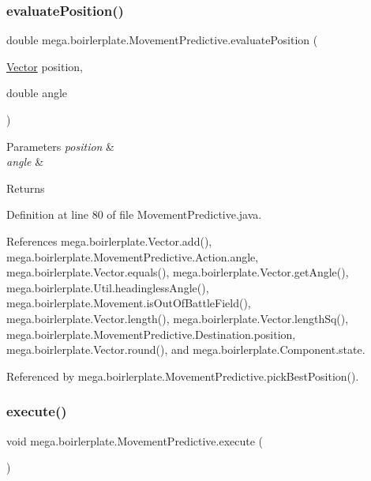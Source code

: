 \subsubsection{\texorpdfstring{evaluate\+Position()}{evaluatePosition()}}
{\footnotesize\ttfamily double mega.\+boirlerplate.\+Movement\+Predictive.\+evaluate\+Position (\begin{DoxyParamCaption}\item[{\hyperlink{classmega_1_1boirlerplate_1_1_vector}{Vector}}]{position,  }\item[{double}]{angle }\end{DoxyParamCaption})\hspace{0.3cm}{\ttfamily [private]}}


\begin{DoxyParams}{Parameters}
{\em position} & \\
\hline
{\em angle} & \\
\hline
\end{DoxyParams}
\begin{DoxyReturn}{Returns}

\end{DoxyReturn}


Definition at line 80 of file Movement\+Predictive.\+java.



References mega.\+boirlerplate.\+Vector.\+add(), mega.\+boirlerplate.\+Movement\+Predictive.\+Action.\+angle, mega.\+boirlerplate.\+Vector.\+equals(), mega.\+boirlerplate.\+Vector.\+get\+Angle(), mega.\+boirlerplate.\+Util.\+headingless\+Angle(), mega.\+boirlerplate.\+Movement.\+is\+Out\+Of\+Battle\+Field(), mega.\+boirlerplate.\+Vector.\+length(), mega.\+boirlerplate.\+Vector.\+length\+Sq(), mega.\+boirlerplate.\+Movement\+Predictive.\+Destination.\+position, mega.\+boirlerplate.\+Vector.\+round(), and mega.\+boirlerplate.\+Component.\+state.



Referenced by mega.\+boirlerplate.\+Movement\+Predictive.\+pick\+Best\+Position().

\mbox{\label{classmega_1_1boirlerplate_1_1_movement_predictive_a853ee3e04ab6da678f29c371f5b76e1a}} 
\subsubsection{\texorpdfstring{execute()}{execute()}}
{\footnotesize\ttfamily void mega.\+boirlerplate.\+Movement\+Predictive.\+execute (\begin{DoxyParamCaption}{ }\end{DoxyParamCaption})}



